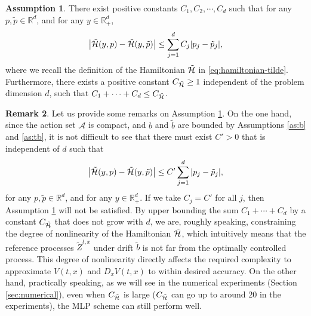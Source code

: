 \documentclass[11pt]{article}
\theoremstyle{definition}
\newtheorem{assumption}{Assumption}[section]
\newtheorem{remark}[assumption]{Remark}
\theoremstyle{plain}
\newcommand{\R}{\mathbb{R}}
\newcommand{\cH}{{\cal H}}
\newcommand{\tb}{\tilde{b}}
\begin{document}
\begin{assumption}\label{asmp:lipschitz-H}
There exist positive constants $C_1, C_2, \cdots, C_d$ such that 
for any $p, \tilde{p} \in \R^d$, and for any $y \in \R_+^d$, 
\begin{equation}
\left|\tilde \cH(y,p) - \tilde \cH(y,\tilde{p})\right| \leq \sum_{j=1}^d C_j |p_j - \tilde{p}_j|, 
\end{equation}
where we recall the definition of the Hamiltonian $\tilde \cH$ in \eqref{eq:hamiltonian-tilde}. 
Furthermore, there exists a positive constant $C_{\tilde \cH}\geq 1$ independent of the problem dimension $d$, 
such that $C_1 +\cdots +C_d \leq C_{\tilde \cH}$.
\end{assumption}
\begin{remark}
Let us provide some remarks on Assumption \ref{asmp:lipschitz-H}. On the one hand, 
since the action set $\mathcal{A}$ is compact, and $b$ and $\tb$ are bounded by Assumptions \ref{as:b} and \ref{as:tb}, 
it is not difficult to see that there must exist $C'> 0$ that is independent of $d$ such that 
\[
\left|\tilde \cH (y, p)-\tilde \cH (y,\tilde{p})\right| \leq C' \sum_{j=1}^d |p_j-\tilde{p}_j|, 
\]
for any $p, \tilde{p} \in \R^d$, and for any $y \in \R_+^d$. 
If we take $C_j = C'$ for all $j$, then Assumption \ref{asmp:lipschitz-H} will not be satisfied. 
By upper bounding the sum $C_1 + \cdots + C_d$ by a constant $C_{\tilde \cH}$ that does not grow with $d$, 
we are, roughly speaking, constraining the degree of nonlinearity of the Hamiltonian $\tilde \cH$, 
which intuitively means that the reference processes $\tilde Z^{t,x}$ under drift $\tb$ is not far from 
the optimally controlled process. 
This degree of nonlinearity directly affects the required complexity to approximate 
$V(t,x)$ and $D_x V(t,x)$ to within desired accuracy. 
On the other hand, practically speaking, as we will see in the numerical experiments (Section \ref{sec:numerical}), 
even when $C_{\tilde \cH}$ is large ($C_{\tilde \cH}$ can go up to around $20$ in the experiments), 
the MLP scheme can still perform well. 
\end{remark}
\end{document}
